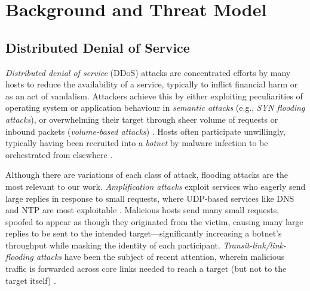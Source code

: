 \documentclass[10pt, times, comsoc]{IEEEtran}
\begin{document}
\section{Background and Threat Model}

\subsection{Distributed Denial of Service}


\emph{Distributed denial of service} (DDoS) attacks are concentrated efforts by many hosts to reduce the availability of a service, typically to inflict financial harm or as an act of vandalism.
Attackers achieve this by either exploiting peculiarities of operating system or application behaviour in \emph{semantic attacks} (e.g., \emph{SYN flooding attacks}), or overwhelming their target through sheer volume of requests or inbound packets (\emph{volume-based attacks}) \cite{DBLP:conf/imc/JonkerKKRSD17}.
Hosts often participate unwillingly, typically having been recruited into a \emph{botnet} by malware infection to be orchestrated from elsewhere \cite{DBLP:conf/uss/AntonakakisABBB17}.

Although there are variations of each class of attack, flooding attacks are the most relevant to our work.
\emph{Amplification attacks} exploit services who eagerly send large replies in response to small requests, where UDP-based services like DNS and NTP are most exploitable \cite{DBLP:conf/ndss/Rossow14, DBLP:conf/uss/KuhrerHRH14}.
Malicious hosts send many small requests, spoofed to appear as though they originated from the victim, causing many large replies to be sent to the intended target---significantly increasing a botnet's throughput while masking the identity of each participant.
\emph{Transit-link/link-flooding attacks} have been the subject of recent attention, wherein malicious traffic is forwarded across core links needed to reach a target (but not to the target itself) \cite{DBLP:conf/sp/KangLG13, DBLP:conf/esorics/StuderP09}.
\end{document}
